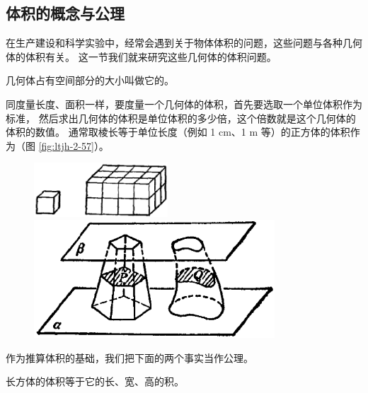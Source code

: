 \subsection{体积的概念与公理}\label{subsec:2-7}

在生产建设和科学实验中，经常会遇到关于物体体积的问题，这些问题与各种几何体的体积有关。
这一节我们就来研究这些几何体的体积问题。

几何体占有空间部分的大小叫做它的。

同度量长度、面积一样，要度量一个几何体的体积，首先要选取一个单位体积作为标准，
然后求出几何体的体积是单位体积的多少倍，这个倍数就是这个几何体的体积的数值。
通常取棱长等于单位长度（例如 1 cm、1 m 等）的正方体的体积作为（图 \ref{fig:ltjh-2-57}）。

\begin{figure}[htbp]
    \centering
    \begin{minipage}[b]{5cm}
        \centering
        \includegraphics[width=5cm]{../pic/ltjh-ch2-57.png}
        \caption{}\label{fig:ltjh-2-57}
    \end{minipage}
    \qquad
    \begin{minipage}[b]{9cm}
        \centering
        \includegraphics[width=9cm]{../pic/ltjh-ch2-58.png}
        \caption{}\label{fig:ltjh-2-58}
\end{minipage}
\end{figure}


作为推算体积的基础，我们把下面的两个事实当作公理。

\begin{gongli}[公理5][gl:5]
    长方体的体积等于它的长、宽、高的积。
    \begin{center}
    \end{center}
\end{gongli}

